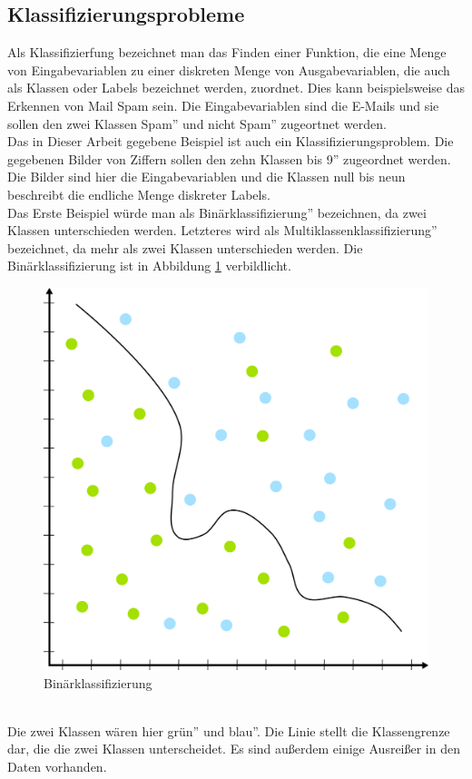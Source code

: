 \documentclass{article}
\begin{document}
\subsection{Klassifizierungsprobleme}
Als Klassifizierfung bezeichnet man das Finden einer Funktion, die eine Menge von Eingabevariablen zu einer diskreten Menge von Ausgabevariablen, die auch als Klassen oder Labels bezeichnet werden, zuordnet. Dies kann beispielsweise das Erkennen von Mail Spam sein. Die Eingabevariablen sind die E-Mails und sie sollen den zwei Klassen \glqq Spam'' und \glqq nicht Spam'' zugeortnet werden.\\
Das in Dieser Arbeit gegebene Beispiel ist auch ein Klassifizierungsproblem. Die gegebenen Bilder von Ziffern sollen den zehn Klassen  bis 9'' zugeordnet werden. Die Bilder sind hier die Eingabevariablen und die Klassen null bis neun beschreibt die endliche Menge diskreter Labels.\\
Das Erste Beispiel würde man als \glqq Binärklassifizierung'' bezeichnen, da zwei Klassen unterschieden werden. Letzteres wird als \glqq Multiklassenklassifizierung'' bezeichnet, da mehr als zwei Klassen unterschieden werden. Die Binärklassifizierung ist in Abbildung \ref{Classification} verbildlicht.
\begin{figure}[h]
	\centering
	\includegraphics[width=0.4\linewidth]{../graphics/Classification.png}
	\caption{Binärklassifizierung}
	\label{Classification}
\end{figure}
\\
Die zwei Klassen wären hier \glqq grün'' und \glqq blau''. Die Linie stellt die Klassengrenze dar, die die zwei Klassen unterscheidet. Es sind außerdem einige Ausreißer in den Daten vorhanden. 
\end{document}
